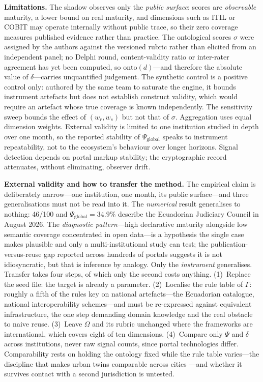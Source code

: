 \documentclass[engproc,proceedingpaper,submit,moreauthors]{Definitions/mdpi}
\begin{document}
\textbf{Limitations.} The shadow observes only the \emph{public surface}: scores are \emph{observable} maturity, a lower bound on real maturity, and dimensions such as ITIL or COBIT may operate internally without public trace, so their zero coverage measures published evidence rather than practice. The ontological scores $\sigma$ were assigned by the authors against the versioned rubric rather than elicited from an independent panel; no Delphi round, content-validity ratio \cite{Lawshe1975} or inter-rater agreement has yet been computed, so $\mathrm{onto}(d)$---and therefore the absolute value of $\delta$---carries unquantified judgement. The synthetic control is a positive control only: authored by the same team to saturate the engine, it bounds instrument artefacts but does not establish construct validity, which would require an artefact whose true coverage is known independently. The sensitivity sweep bounds the effect of $(w_r,w_s)$ but not that of $\sigma$. Aggregation uses equal dimension weights. External validity is limited to one institution studied in depth over one month, so the reported stability of $\Psi_{\mathrm{global}}$ speaks to instrument repeatability, not to the ecosystem's behaviour over longer horizons. Signal detection depends on portal markup stability; the cryptographic record attenuates, without eliminating, observer drift.

\textbf{External validity and how to transfer the method.} The empirical claim is deliberately narrow---one institution, one month, its public surface---and three generalisations must not be read into it. The \emph{numerical} result generalises to nothing: 46/100 and $\Psi_{\mathrm{global}}=34.9\%$ describe the Ecuadorian Judiciary Council in August 2026. The \emph{diagnostic pattern}---high declarative maturity alongside low semantic coverage concentrated in open data---is a hypothesis the single case makes plausible and only a multi-institutional study can test; the publication-versus-reuse gap reported across hundreds of portals \cite{Janssen2012,Attard2015,Neumaier2016} suggests it is not idiosyncratic, but that is inference by analogy. Only the \emph{instrument} generalises. Transfer takes four steps, of which only the second costs anything. (1)~Replace the seed file: the target is already a parameter. (2)~Localise the rule table of $\Gamma$: roughly a fifth of the rules key on national artefacts---the Ecuadorian catalogue, national interoperability schemes---and must be re-expressed against equivalent infrastructure, the one step demanding domain knowledge and the real obstacle to naive reuse. (3)~Leave $\Omega$ and its rubric unchanged where the frameworks are international, which covers eight of ten dimensions. (4)~Compare only $\Psi$ and $\delta$ across institutions, never raw signal counts, since portal technologies differ. Comparability rests on holding the ontology fixed while the rule table varies---the discipline that makes urban twins comparable across cities \cite{Shahat2021,Haraguchi2024}---and whether it survives contact with a second jurisdiction is untested.
\end{document}
